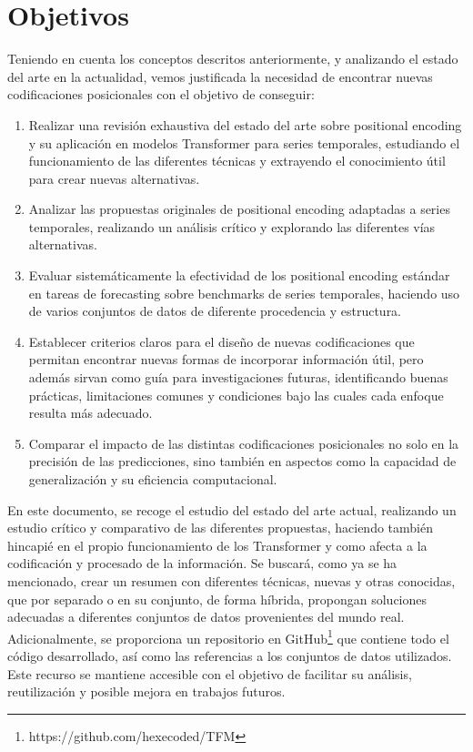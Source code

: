\section{Objetivos}

Teniendo en cuenta los conceptos descritos anteriormente, y analizando el estado del arte en la actualidad, vemos justificada la necesidad de encontrar nuevas codificaciones posicionales con el objetivo de conseguir:

\begin{enumerate}
	\item Realizar una revisión exhaustiva del estado del arte sobre positional encoding y su aplicación en modelos Transformer para series temporales, estudiando el funcionamiento de las diferentes técnicas y extrayendo el conocimiento útil para crear nuevas alternativas.
	
	\item Analizar las propuestas originales de positional encoding adaptadas a series temporales, realizando un análisis crítico y explorando las diferentes vías alternativas.
	
	\item Evaluar sistemáticamente la efectividad de los positional encoding estándar en tareas de forecasting sobre benchmarks de series temporales, haciendo uso de varios conjuntos de datos de diferente procedencia y estructura.
	
	\item Establecer criterios claros para el diseño de nuevas codificaciones que permitan encontrar nuevas formas de incorporar información útil, pero además sirvan como guía para investigaciones futuras, identificando buenas prácticas, limitaciones comunes y condiciones bajo las cuales cada enfoque resulta más adecuado.
	
	\item Comparar el impacto de las distintas codificaciones posicionales no solo en la precisión de las predicciones, sino también en aspectos como la capacidad de generalización y su eficiencia computacional.

\end{enumerate}

En este documento, se recoge el estudio del estado del arte actual, realizando un estudio crítico y comparativo de las diferentes propuestas, haciendo también hincapié en el propio funcionamiento de los Transformer y como afecta a la codificación y procesado de la información. Se buscará, como ya se ha mencionado, crear un resumen con diferentes técnicas, nuevas y otras conocidas, que por separado o en su conjunto, de forma híbrida, propongan soluciones adecuadas a diferentes conjuntos de datos provenientes del mundo real.\\

Adicionalmente, se proporciona un repositorio en GitHub\footnote{https://github.com/hexecoded/TFM} que contiene todo el código desarrollado, así como las referencias a los conjuntos de datos utilizados. Este recurso se mantiene accesible con el objetivo de facilitar su análisis, reutilización y posible mejora en trabajos futuros.